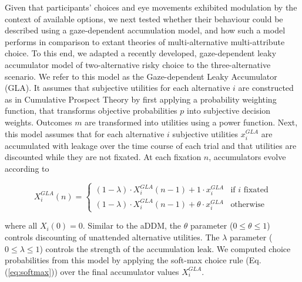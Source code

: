 \documentclass[11pt, a4paper]{article}
\begin{document}
Given that participants’ choices and eye movements exhibited modulation by the context of available options, we next tested whether their behaviour could be described using a gaze-dependent accumulation model, and how such a model performs in comparison to extant theories of multi-alternative multi-attribute choice. To this end, we adapted a recently developed, gaze-dependent leaky accumulator model of two-alternative risky choice \autocite{glickman2019FormationPreferenceRisky} to the three-alternative scenario. We refer to this model as the Gaze-dependent Leaky Accumulator (GLA). It assumes that subjective utilities for each alternative $i$ are constructed as in Cumulative Prospect Theory \autocite{tversky1992AdvancesProspectTheory} by first applying a probability weighting function, that transforms objective probabilities $p$ into subjective decision weights. Outcomes $m$ are transformed into utilities using a power function. Next, this model assumes that for each alternative $i$ subjective utilities $x_i^{GLA}$ are accumulated with leakage over the time course of each trial and that utilities are discounted while they are not fixated. At each fixation $n$, accumulators evolve according to

\begin{equation}
    \label{eq:gla:accumulator}
    X_i^{GLA}(n) = \begin{cases}
             (1 - \lambda) \cdot X_i^{GLA}(n - 1) + 1 \cdot x_i^{GLA} &\text{if $i$ fixated}\\
             (1 - \lambda) \cdot X_i^{GLA}(n - 1) + \theta \cdot x_i^{GLA} &\text{otherwise}
             \end{cases}
\end{equation}

where all $X_i(0)=0$. Similar to the aDDM, the $\theta$ parameter ($0 \le \theta \le 1$) controls discounting of unattended alternative utilities. The $\lambda$ parameter ($0 \le \lambda \le 1$) controls the strength of the accumulation leak. We computed choice probabilities from this model by applying the soft-max choice rule (Eq. (\ref{eq:softmax})) over the final accumulator values $X_i^{GLA}$.
\end{document}
